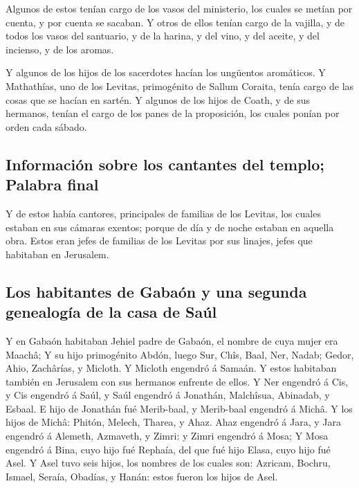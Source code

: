  Algunos de estos tenían cargo de los vasos del
ministerio, los cuales se metían por cuenta, y por cuenta se sacaban.
 Y otros de ellos tenían cargo de la vajilla, y de todos
los vasos del santuario, y de la harina, y del vino, y del aceite, y del
incienso, y de los aromas.

 Y algunos de los hijos de los sacerdotes hacían los
ungüentos aromáticos.  Y Mathathías, uno de los Levitas,
primogénito de Sallum Coraita, tenía cargo de las cosas que se hacían en
sartén.  Y algunos de los hijos de Coath, y de sus
hermanos, tenían el cargo de los panes de la proposición, los cuales
ponían por orden cada sábado.

\hypertarget{informaciuxf3n-sobre-los-cantantes-del-templo-palabra-final}{%
\subsection{Información sobre los cantantes del templo; Palabra
final}\label{informaciuxf3n-sobre-los-cantantes-del-templo-palabra-final}}

 Y de estos había cantores, principales de familias de
los Levitas, los cuales estaban en sus cámaras exentos; porque de día y
de noche estaban en aquella obra.  Estos eran jefes de
familias de los Levitas por sus linajes, jefes que habitaban en
Jerusalem.

\hypertarget{los-habitantes-de-gabauxf3n-y-una-segunda-genealoguxeda-de-la-casa-de-sauxfal}{%
\subsection{Los habitantes de Gabaón y una segunda genealogía de la casa
de
Saúl}\label{los-habitantes-de-gabauxf3n-y-una-segunda-genealoguxeda-de-la-casa-de-sauxfal}}

 Y en Gabaón habitaban Jehiel padre de Gabaón, el nombre
de cuya mujer era Maachâ;  Y su hijo primogénito Abdón,
luego Sur, Chîs, Baal, Ner, Nadab;  Gedor, Ahio,
Zachârías, y Micloth.  Y Micloth engendró á Samaán. Y
estos habitaban también en Jerusalem con sus hermanos enfrente de ellos.
 Y Ner engendró á Cis, y Cis engendró á Saúl, y Saúl
engendró á Jonathán, Malchîsua, Abinadab, y Esbaal.  E
hijo de Jonathán fué Merib-baal, y Merib-baal engendró á Michâ.
 Y los hijos de Michâ: Phitón, Melech, Tharea, y Ahaz.
 Ahaz engendró á Jara, y Jara engendró á Alemeth,
Azmaveth, y Zimri: y Zimri engendró á Mosa;  Y Mosa
engendró á Bina, cuyo hijo fué Rephaía, del que fué hijo Elasa, cuyo
hijo fué Asel.  Y Asel tuvo seis hijos, los nombres de
los cuales son: Azricam, Bochru, Ismael, Seraía, Obadías, y Hanán: estos
fueron los hijos de Asel.


